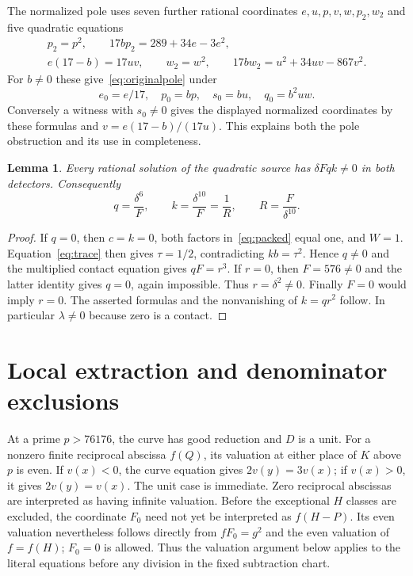\documentclass[11pt,a4paper]{article}
\newtheorem{lemma}[theorem]{Lemma}
\begin{document}
The normalized pole uses seven further rational coordinates
$e,u,p,v,w,p_2,w_2$ and five quadratic equations
\begin{equation}\label{eq:normalizedpole}
 \begin{gathered}
 p_2=p^2,\qquad 17bp_2=289+34e-3e^2,\\
 e(17-b)=17uv,\qquad w_2=w^2,\qquad
 17bw_2=u^2+34uv-867v^2.
 \end{gathered}
\end{equation}
For $b\ne0$ these give~\eqref{eq:originalpole} under
\[
 e_0=e/17,\quad p_0=bp,\quad s_0=bu,\quad q_0=b^2uw.
\]
Conversely a witness with $s_0\ne0$ gives the displayed normalized
coordinates by these formulas and $v=e(17-b)/(17u)$.
This explains both the pole obstruction and its use in completeness.

\begin{lemma}\label{lem:domain}
Every rational solution of the quadratic source has $\delta Fqk\ne0$
in both detectors. Consequently
\[
 q=\frac{\delta^6}{F},\qquad
 k=\frac{\delta^{10}}F=\frac1R,
 \qquad R=\frac F{\delta^{10}}.
\]
\end{lemma}
\begin{proof}
If $q=0$, then $c=k=0$, both factors in~\eqref{eq:packed} equal one,
and $W=1$. Equation~\eqref{eq:trace} then gives $\tau=1/2$,
contradicting $kb=\tau^2$. Hence $q\ne0$ and the multiplied contact
equation gives $qF=r^3$.
If $r=0$, then $F=576\ne0$ and the latter identity gives $q=0$,
again impossible. Thus $r=\delta^2\ne0$. Finally $F=0$ would imply
$r=0$. The asserted formulas and the nonvanishing of $k=qr^2$ follow.
In particular $\lambda\ne0$ because zero is a contact.
\end{proof}

\section{Local extraction and denominator exclusions}

At a prime $p>76176$, the curve has good reduction and $D$ is a unit.
For a nonzero finite reciprocal abscissa $f(Q)$, its valuation at
either place of $K$ above $p$ is even. If $v(x)<0$, the curve equation
gives $2v(y)=3v(x)$; if $v(x)>0$, it gives $2v(y)=v(x)$.
The unit case is immediate. Zero reciprocal abscissas are interpreted
as having infinite valuation.
Before the exceptional $H$ classes are excluded, the coordinate $F_0$
need not yet be interpreted as $f(H-P)$. Its even valuation nevertheless
follows directly from $fF_0=g^2$ and the even valuation of $f=f(H)$;
$F_0=0$ is allowed. Thus the valuation argument below applies to the
literal equations before any division in the fixed subtraction chart.
\end{document}
